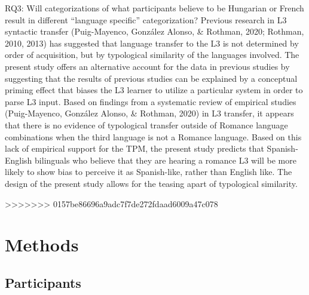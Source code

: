 \documentclass[
  english,
  man]{apa6}
\begin{document}
RQ3: Will categorizations of what participants believe to be Hungarian or French result in different ``language specific'' categorization?
Previous research in L3 syntactic transfer (Puig-Mayenco, González Alonso, \& Rothman, 2020; Rothman, 2010, 2013) has suggested that language transfer to the L3 is not determined by order of acquisition, but by typological similarity of the languages involved.
The present study offers an alternative account for the data in previous studies by suggesting that the results of previous studies can be explained by a conceptual priming effect that biases the L3 learner to utilize a particular system in order to parse L3 input.
Based on findings from a systematic review of empirical studies (Puig-Mayenco, González Alonso, \& Rothman, 2020) in L3 transfer, it appears that there is no evidence of typological transfer outside of Romance language combinations when the third language is not a Romance language.
Based on this lack of empirical support for the TPM, the present study predicts that Spanish-English bilinguals who believe that they are hearing a romance L3 will be more likely to show bias to perceive it as Spanish-like, rather than English like.
The design of the present study allows for the teasing apart of typological similarity.

>>>>>>> 0157be86696a9adc7f7de272fdaad6009a47c078
\hypertarget{methods}{%
\section{Methods}\label{methods}}

\hypertarget{participants}{%
\subsection{Participants}\label{participants}}
\end{document}
